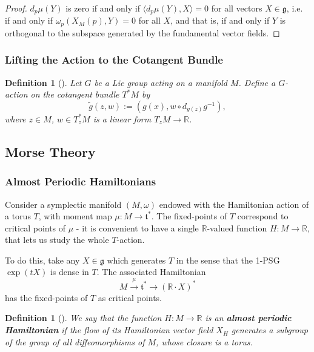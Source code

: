 \documentclass{article}
\newtheorem{defn}[theorem]{Definition\rm}
\newcommand{\ra}{\rightarrow}
\newcommand{\lra}{\longrightarrow}
\newcommand{\w}{\omega}
\newcommand{\RR}{\mathbb{R}}
\newcommand{\mfg}{\mathfrak{g}}
\newcommand{\mft}{\mathfrak{t}}
\begin{document}
	\begin{proof}
		$d_{p}\mu(Y)$ is zero if and only if $\langle d_{p}\mu(Y), X \rangle = 0$ for all vectors $X \in \mfg$, i.e. if and only if $\w_{p}(X_{M}(p), Y) = 0$ for all $X$, and that is, if and only if $Y$ is orthogonal to the subspace generated by the fundamental vector fields.
	\end{proof}

	\subsubsection{Lifting the Action to the Cotangent Bundle}
	
	\begin{defn}[\cite{Audin1997}]
		Let $G$ be a Lie group acting on a manifold $M$. Define a $G$-action on the cotangent bundle $T^{\ast}M$ by
		\[
			\tilde{g}(z,w) := (g(x), w \circ d_{g(z)}g^{-1}),
		\]
		where $z \in M$, $w \in T_{z}^{\ast}M$ is a linear form $T_{z}M \ra \RR$.
	\end{defn}
	
	\subsection{Morse Theory}

	\subsubsection{Almost Periodic Hamiltonians}
	
	Consider a symplectic manifold $(M, \w)$ endowed with the Hamiltonian action of a torus $T$, with moment map $\mu : M \ra \mft^{\ast}$. The fixed-points of $T$ correspond to critical points of $\mu$ - it is convenient to have a single $\RR$-valued function $H : M \ra \RR$, that lets us study the whole $T$-action.
	
	To do this, take any $X \in \mfg$ which generates $T$ in the sense that the 1-PSG $\exp(tX)$ is dense in $T$. The associated Hamiltonian
	\[
		M \overset{\mu}{\lra} \mft^{\ast} \lra (\RR \cdot X)^{\ast}
	\]
	has the fixed-points of $T$ as critical points.
	
	\begin{defn}[\cite{Audin1997}]
		We say that the function $H : M \ra \RR$ is an \textbf{almost periodic Hamiltonian} if the flow of its Hamiltonian vector field $X_{H}$ generates a subgroup of the group of all diffeomorphisms of $M$, whose closure is a torus.
	\end{defn}
\end{document}
